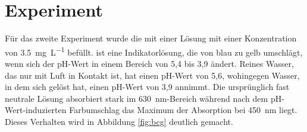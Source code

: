 % 



\section{\COTm Experiment}
\label{sec:cot}
Für das zweite Experiment wurde die \HSCs mit einer \BCG Lösung mit einer Konzentration von \SI[round-precision=1]{3,5}{\milli\gram\per\liter} befüllt. 
\BCG ist eine Indikatorlösung, die von blau zu gelb umschlägt, wenn sich der pH-Wert in einem Bereich von 5,4 bis 3,9 ändert. Reines Wasser, das nur mit Luft in Kontakt ist, hat einen pH-Wert von 5,6, wohingegen Wasser, in dem sich \COT gelöst hat, einen pH-Wert von 3,9 annimmt. Die ursprünglich fast neutrale Lösung absorbiert stark im \SI{630}{\nano\meter}-Bereich während nach dem pH-Wert-induzierten Farbumschlag das Maximum der Absorption bei \SI{450}{\nano\meter} liegt. Dieses Verhalten wird in Abbildung \ref{fig:bcg} deutlich gemacht.

